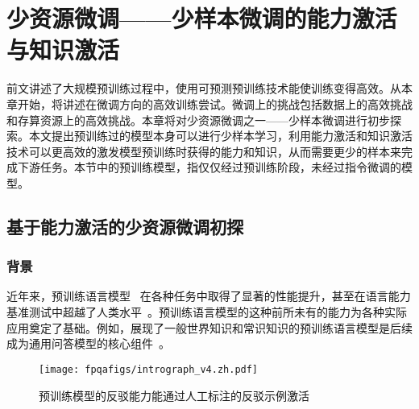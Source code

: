 \chapter{少资源微调——少样本微调的能力激活与知识激活}

前文讲述了大规模预训练过程中，使用可预测预训练技术能使训练变得高效。从本章开始，将讲述在微调方向的高效训练尝试。微调上的挑战包括数据上的高效挑战和存算资源上的高效挑战。本章将对少资源微调之一——少样本微调进行初步探索。本文提出预训练过的模型本身可以进行少样本学习，利用能力激活和知识激活技术可以更高效的激发模型预训练时获得的能力和知识，从而需要更少的样本来完成下游任务。本节中的预训练模型，指仅仅经过预训练阶段，未经过指令微调的模型。


\section{基于能力激活的少资源微调初探}

\subsection{背景}
近年来，预训练语言模型~\cite{lewis-etal-2020-bart, han2021pretrained, raffel2020exploring, brown2020language} 在各种任务中取得了显著的性能提升，甚至在语言能力基准测试中超越了人类水平~\cite{wang-etal-2018-glue, wang2019superglue,srivastava2022beyond}。预训练语言模型的这种前所未有的能力为各种实际应用奠定了基础。例如，展现了一般世界知识和常识知识的预训练语言模型是后续成为通用问答模型的核心组件~\cite{tafjord2021general,guu2020retrieval}。

\begin{figure}[!htpb]
    \centering
    \texttt{[image: fpqafigs/intrograph\_v4.zh.pdf]}
    \caption{预训练模型的反驳能力能通过人工标注的反驳示例激活}
    \label{fig:intrograph}
\end{figure}

\begin{table}[]
    \centering
    \caption{一些先前的研究指出了预训练模型面对误导性问题的脆弱性}
    \label{tab:intro_example}
\end{table}

